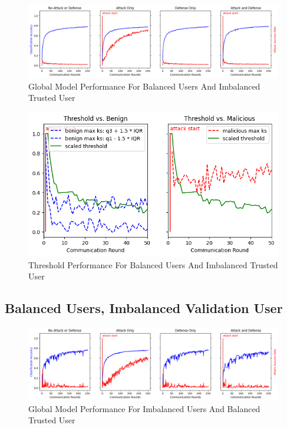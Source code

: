 \documentclass{article} %
\begin{document}
\begin{figure}[H]
    \centering
    \includegraphics[width=\textwidth]{01_trusted/centralized/alpha10000--alpha_val1/visuals/accuracy--n_malicious1--m_start1.png}
    \caption{Global Model Performance For Balanced Users And Imbalanced Trusted User}
    \label{fig:centralized--alpha10000--alpha_val1--accuracy--n_malicious1--m_start1}
\end{figure}

\begin{figure}[H]
    \centering
    \includegraphics[width=.75\textwidth]{01_trusted/centralized/alpha10000--alpha_val1/visuals/threshold--n_malicious1--m_start1--d_rounds50.png}
    \caption{Threshold Performance For Balanced Users And Imbalanced Trusted User}
    \label{fig:centralized--alpha10000--alpha_val1--threshold--n_malicious1--m_start1--d_rounds50}
\end{figure}

%
\subsection{Balanced Users, Imbalanced Validation User}
\label{sec.imbal_users}

\begin{figure}[H]
    \centering
    \includegraphics[width=\textwidth]{01_trusted/centralized/alpha1--alpha_val1/visuals/accuracy--n_malicious1--m_start1.png}
    \caption{Global Model Performance For Imbalanced Users And Balanced Trusted User}
    \label{fig:centralized--alpha1--alpha_val10000--accuracy--n_malicious1--m_start1}
\end{figure} 
\end{document}
